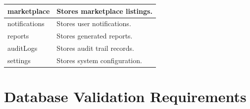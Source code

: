 \begin{longtable}{|p{5cm}|p{8cm}|}
\hline

marketplace

&

Stores marketplace listings.

\\

\hline

notifications

&

Stores user notifications.

\\

\hline

reports

&

Stores generated reports.

\\

\hline

auditLogs

&

Stores audit trail records.

\\

\hline

settings

&

Stores system configuration.

\\

\hline

\end{longtable}

\section{Database Validation Requirements}
\label{sec:database-validation}

